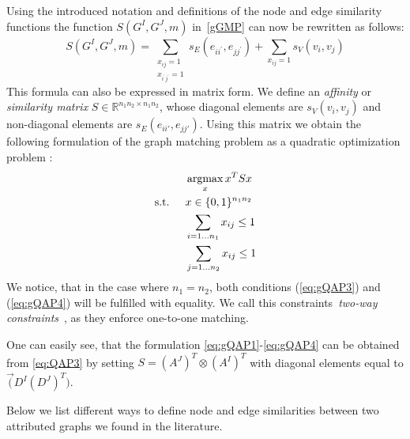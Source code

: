 Using the introduced notation and definitions of the node and edge similarity functions the function $S(G^I,G^J,m)$ in~\eqref{gGMP} can now be rewritten as follows:
\begin{equation}\label{eq:sumQAP}
	S(G^I,G^J,m)=\sum_{\substack{x_{ij}=1\\x_{i^\prime j^\prime}=1}}s_E(e_{ii^\prime},e_{jj^\prime}) + \sum_{x_{ij}=1}s_V(v_{i},v_{j})
\end{equation}
This formula can also be expressed in matrix form. We define an \emph{affinity} or \emph{similarity matrix} $S\in\mathbb{R}^{n_1n_2\times n_1n_2}$, whose diagonal elements are $s_V(v_i, v_j)$ and non-diagonal elements are $s_E(e_{ii\prime}, e_{jj\prime})$. Using this matrix we obtain the following formulation of the graph matching problem as a quadratic optimization problem \cite{Cho2010_RRWM, Cho2012_ProgressiveGM,Cho2014_Haystack, Conte2004,Rangarajan1996_GAGM,Leordeanu2005_SM,Leordeanu2009_IPFP}:
\begin{alignat}{2}
    &     && \argmax_x{x^TSx}                           \label{eq:gQAP1}\\ %
    & \text{s.t. } &&  x\in \{0,1\}^{n_1n_2}            \label{eq:gQAP2}\\
    &             &&  \sum_{i=1\dots n_1} x_{ij}\le 1    \label{eq:gQAP3}\\
    &             &&  \sum_{j=1\dots n_2} x_{ij}\le 1    \label{eq:gQAP4}
\end{alignat}
We notice, that in the case where $n_1=n_2$, both conditions (\ref{eq:gQAP3}) and (\ref{eq:gQAP4}) will be fulfilled with equality. We call this constraints~\emph{two-way constraints}~\cite{Rangarajan1996_GAGM}, as they enforce one-to-one matching.

One can easily see, that the formulation \eqref{eq:gQAP1}-\eqref{eq:gQAP4} can be obtained from \eqref{eq:QAP3} by setting $S=(A^J)^T\otimes(A^I)^T$ with diagonal elements equal to $\vec(D^I(D^J)^T)$.

Below we list different ways to define node and edge similarities between two attributed graphs we found in the literature.

